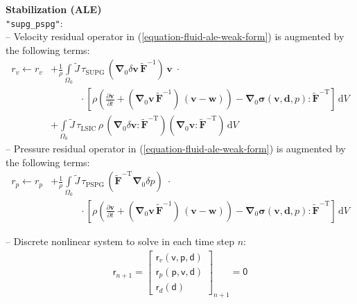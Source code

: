 \documentclass[a4paper,12pt]{report}
\newcommand{\bs}[1]{\boldsymbol{#1}}
\newcommand{\Om}{\mathit{\Omega}}
\newcommand{\ROP}{\bs{\mathsf{r}}}
\begin{document}
\textbf{Stabilization (ALE)}\\

\verb."supg_pspg".:\\
-- Velocity residual operator in (\ref{equation-fluid-ale-weak-form}) is augmented by the following terms:
\begin{equation}
\begin{aligned}
r_v \leftarrow r_v &+ \frac{1}{\rho}\int\limits_{\Om_0}\widetilde{J}\, \tau_{\mathrm{SUPG}}\,(\bs{\nabla}_0\delta\bs{v}\,\widetilde{\bs{F}}^{-1})\,\bs{v}\;\cdot \\
& \qquad\quad \cdot\left[\rho\left(\frac{\partial \bs{v}}{\partial t} + (\bs{\nabla}_0\bs{v}\,\widetilde{\bs{F}}^{-1})\,(\bs{v}-\bs{w})\right) - \bs{\nabla}_{0} \bs{\sigma}(\bs{v},\bs{d},p) : \widetilde{\bs{F}}^{-\mathrm{T}}\right]\,\mathrm{d}V \\
& + \int\limits_{\Om_0}\widetilde{J}\, \tau_{\mathrm{LSIC}}\,\rho\,(\bs{\nabla}_{0}\delta\bs{v} : \widetilde{\bs{F}}^{-\mathrm{T}})(\bs{\nabla}_{0}\bs{v} : \widetilde{\bs{F}}^{-\mathrm{T}})\,\mathrm{d}V
\end{aligned}
\end{equation}
-- Pressure residual operator in (\ref{equation-fluid-ale-weak-form}) is augmented by the following terms:
\begin{equation}
\begin{aligned}
r_p \leftarrow r_p &+ \frac{1}{\rho}\int\limits_{\Om_0}\widetilde{J}\, \tau_{\mathrm{PSPG}}\,(\widetilde{\bs{F}}^{-\mathrm{T}}\bs{\nabla}_{0}\delta p) \;\cdot \\
& \qquad\quad \cdot \left[\rho\left(\frac{\partial \bs{v}}{\partial t} + (\bs{\nabla}_0\bs{v}\,\widetilde{\bs{F}}^{-1})\,(\bs{v}-\bs{w})\right) - \bs{\nabla}_{0} \bs{\sigma}(\bs{v},\bs{d},p) : \widetilde{\bs{F}}^{-\mathrm{T}}\right]\,\mathrm{d}V
\end{aligned}
\end{equation}

-- Discrete nonlinear system to solve in each time step $n$:
\begin{equation}
\label{equation-nonlin-sys-fluid-ale}
\begin{aligned}
\ROP_{n+1} = \begin{bmatrix} \ROP_{v}(\bs{\mathsf{v}},\bs{\mathsf{p}},\bs{\mathsf{d}}) \\ \ROP_{p}(\bs{\mathsf{p}},\bs{\mathsf{v}},\bs{\mathsf{d}}) \\ \ROP_{d}(\bs{\mathsf{d}}) \end{bmatrix}_{n+1} = \bs{\mathsf{0}}
\end{aligned}
\end{equation}
\end{document}
